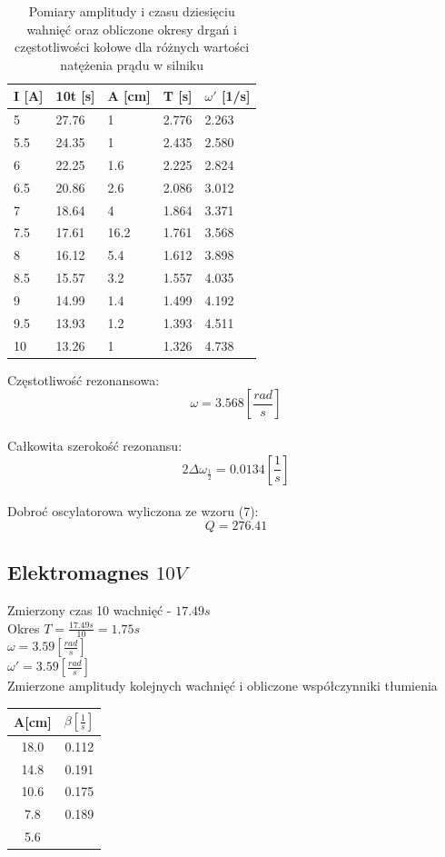 \documentclass[]{article}
\begin{document}
	\begin{table}[h]
		\centering
		\caption{Pomiary amplitudy i czasu dziesięciu wahnięć oraz obliczone okresy drgań i częstotliwości kołowe dla różnych wartości natężenia prądu w silniku}
		\begin{tabular}{|l|l|l|l|l|}
			\hline
			
			I [A] & 10t [s] & A [cm] & T [s] & $\omega'$ [1/s] \\ \hline
			5 & 27.76 & 1 & 2.776 & 2.263 \\ \hline
			5.5 & 24.35 & 1 & 2.435 & 2.580 \\ \hline
			6 & 22.25 & 1.6 & 2.225 & 2.824 \\ \hline
			6.5 & 20.86 & 2.6 & 2.086 & 3.012 \\ \hline
			7 & 18.64 & 4 & 1.864 & 3.371 \\ \hline
			7.5 & 17.61 & 16.2 & 1.761 & 3.568 \\ \hline
			8 & 16.12 & 5.4 & 1.612 & 3.898 \\ \hline
			8.5 & 15.57 & 3.2 & 1.557 & 4.035 \\ \hline
			9 & 14.99 & 1.4 & 1.499 & 4.192 \\ \hline
			9.5 & 13.93 & 1.2 & 1.393 & 4.511 \\ \hline
			10 & 13.26 & 1 & 1.326 & 4.738 \\ \hline
			
		\end{tabular}
	\end{table}
	
	Częstotliwość rezonansowa:
	$$\omega = 3.568 \left[ \frac{rad}{s}\right]$$\\
	Całkowita szerokość rezonansu:
	$$2\Delta\omega_{\frac{1}{2}} = 0.0134 \left[ \frac{1}{s}\right] $$\\	
	Dobroć oscylatorowa wyliczona ze wzoru (7):
	$$Q = 276.41$$
	
	
	\subsection{Elektromagnes $10V$}
	Zmierzony czas 10 wachnięć - $17.49s$\\
	Okres $T=\frac{17.49s}{10} = 1.75s$\\
	$\omega = 3.59 \left[ \frac{rad}{s}\right]$\\
	$\omega' = 3.59 \left[ \frac{rad}{s}\right]$\\
	Zmierzone amplitudy kolejnych wachnięć i obliczone współczynniki tłumienia
	\begin{table}[h]
		\begin{tabular}{|c|c|}
			\hline 
			A[cm] & $\beta\left[ \frac{1}{s}\right] $ \\ 
			\hline 
			18.0 & 0.112 \\ 
			\hline 
			14.8 & 0.191 \\ 
			\hline 
			10.6 & 0.175 \\ 
			\hline 
			7.8 & 0.189 \\ 
			\hline 
			5.6 &  \\ 
			\hline 
		\end{tabular} 
	\end{table}
\end{document}
